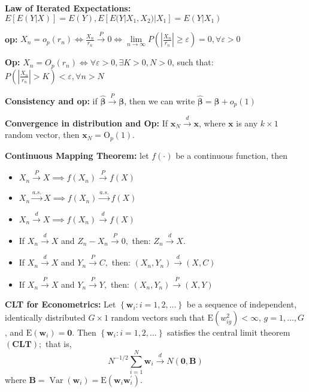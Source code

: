 \textbf{Law of Iterated Expectations: }$ E[E(Y|X)] = E(Y), E[E(Y|X_1,X_2)|X_1] = E(Y|X_1) $

\textbf{op: }$ X_n = o_p(r_n) \iff \frac{X_n}{r_n} \xrightarrow{P} 0 \iff \lim\limits_{n\to\infty} P\left( \left| \frac{X_n}{r_n} \right| \geq \varepsilon \right) = 0, \forall \varepsilon > 0 $

\textbf{Op: }$ X_n = O_p(r_n) \iff \forall \varepsilon > 0, \exists K > 0, N > 0$, such that: $P\left(\left|\frac{X_{n}}{r_n}\right|>K\right)<\varepsilon, \forall n>N$

\textbf{Consistency and op: } if $\hat{\bm{\beta}} \xrightarrow{P} \bm{\beta}$, then we can write $\hat{\bm{\beta}} = \bm{\beta} + o_p(1)$

\textbf{Convergence in distribution and Op: }If $\mathbf{x}_{N} \stackrel{d}{\rightarrow} \mathbf{x}$, where $\mathbf{x}$ is any $k \times 1$ random vector, then $\mathbf{x}_{N}=\mathrm{O}_{p}(1)$.

\textbf{Continuous Mapping Theorem: }let $ f(\cdot) $ be a continuous function, then 
\begin{itemize}
\item $ X_n \xrightarrow{P} X \implies f(X_n) \xrightarrow{P} f(X) $
\item $ X_n \xrightarrow{a.s.} X \implies f(X_n) \xrightarrow{a.s.} f(X) $
\item $ X_n \xrightarrow{d} X \implies f(X_n) \xrightarrow{d} f(X) $
\item If $X_{n} \xrightarrow{d} X$ and $Z_{n}-X_{n} \xrightarrow{P} 0,$ then: $Z_{n} \xrightarrow{d} X$.
\item If $X_{n} \xrightarrow{d} X$ and $Y_{n} \xrightarrow{P} C,$ then: $\left(X_{n}, Y_{n}\right) \xrightarrow{d} (X, C)$
\item If $X_{n} \xrightarrow{P} X$ and $Y_{n} \xrightarrow{P} Y,$ then: $\left(X_{n}, Y_{n}\right) \xrightarrow{P} (X, Y)$
\end{itemize}

\textbf{CLT for Econometrics: }Let $\left\{\mathbf{w}_{i}: i=1,2, \ldots\right\}$ be a sequence of independent, identically distributed $G \times 1$ random vectors such that $\mathrm{E}\left(w_{i g}^{2}\right)<\infty$, $g=1, \ldots, G$, and $\mathrm{E}\left(\mathbf{w}_{i}\right)=\mathbf{0}$. Then $\left\{\mathbf{w}_{i}: i=1,2, \ldots\right\}$ satisfies the central limit theorem $(\mathbf{C L T}) ;$ that is,
\[ N^{-1 / 2} \sum_{i=1}^{N} \mathbf{w}_{i} \xrightarrow{d} N(\mathbf{0}, \mathbf{B}) \]
where $\mathbf{B}=\operatorname{Var}\left(\mathbf{w}_{i}\right)=\mathrm{E}\left(\mathbf{w}_{i} \mathbf{w}_{i}^{\prime}\right)$.